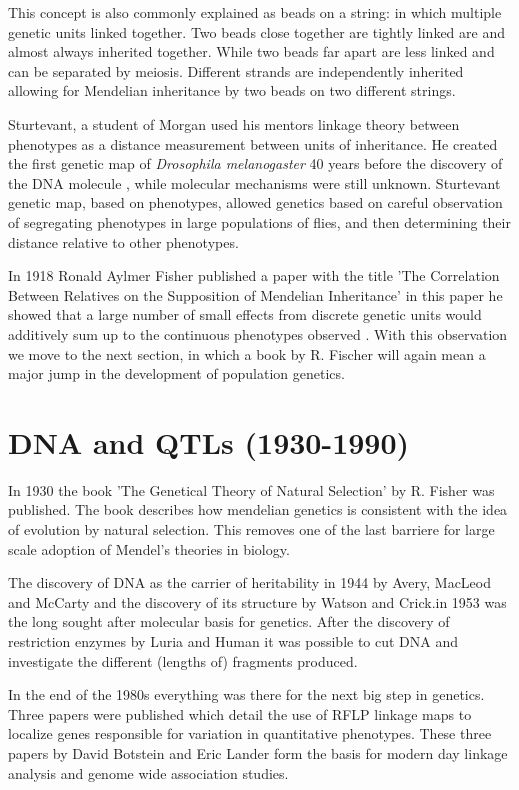 This concept is also commonly explained as beads on a string: in which multiple genetic 
units linked together. Two beads close together are tightly linked are and almost always 
inherited together. While two beads far apart are less linked and can be separated by 
meiosis. Different strands are independently inherited allowing for Mendelian 
inheritance by two beads on two different strings.

Sturtevant, a student of Morgan used his mentors linkage theory between phenotypes 
as a distance measurement between units of inheritance. He created the first genetic 
map of \emph{Drosophila melanogaster} 40 years before the discovery of the DNA molecule \cite{Morgan:1915}, 
while molecular mechanisms were still unknown. Sturtevant genetic map, based on 
phenotypes, allowed genetics based on careful observation of segregating phenotypes in 
large populations of flies, and then determining their distance relative to other 
phenotypes.

In 1918 Ronald Aylmer Fisher published a paper with the title 'The Correlation Between 
Relatives on the Supposition of Mendelian Inheritance' in this paper he showed that a 
large number of small effects from discrete genetic units would additively sum up to 
the continuous phenotypes observed \cite{Fisher:1918}. With this observation we move 
to the next section, in which a book by R. Fischer will again mean a major jump in 
the development of population genetics.

\section{DNA and QTLs (1930-1990)}
In 1930 the book 'The Genetical Theory of Natural Selection' \cite{Fisher:1930} by R. 
Fisher was published. The book describes how mendelian genetics is consistent with the 
idea of evolution by natural selection. This removes one of the last barriere for large 
scale adoption of Mendel's theories in biology.

The discovery of DNA as the carrier of heritability in 1944 by Avery, MacLeod and McCarty 
\cite{Avery:1944} and the discovery of its structure by Watson and Crick.in 1953 
\cite{Watson:1953} was the long sought after molecular basis for genetics. After the 
discovery of restriction enzymes by Luria and Human \cite{Luria:1952} it was possible 
to cut DNA and investigate the different (lengths of) fragments produced.

In the end of the 1980s everything was there for the next big step in genetics. Three 
papers were published which detail the use of RFLP linkage maps to localize genes 
responsible for variation in quantitative phenotypes. These three papers by David Botstein 
and Eric Lander \cite{Lander:1986, Lander:1987, Lander:1989} form the basis for modern 
day linkage analysis and genome wide association studies. 

